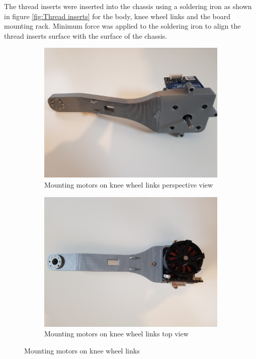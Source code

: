 The thread inserts were inserted into the chassis using a soldering iron as shown in figure \ref{fig:Thread inserts} for the body, knee wheel links and the board mounting rack.
Minimum force was applied to the soldering iron to align the thread inserts surface with the surface of the chassis.
\begin{figure}[h]
	\centering
	\begin{subfigure}[t]{0.45\textwidth}
		\includegraphics[height=0.7\textwidth]{mounting_motors_on_knee_wheel_links_1}
		\caption{Mounting motors on knee wheel links perspective view}
		\label{fig:mountingmotorsonkneewheellinksperpectiveview}
	\end{subfigure}
	\begin{subfigure}[t]{0.45\textwidth}
		\includegraphics[height=0.7\textwidth]{mounting_motors_on_knee_wheel_links_2}
		\caption{Mounting motors on knee wheel links top view}
		\label{fig:mountingmotorsonkneewheellinkstopview}
	\end{subfigure}
	\caption{Mounting motors on knee wheel links}
	\label{fig:Mounting motors on knee wheel links}
\end{figure}

